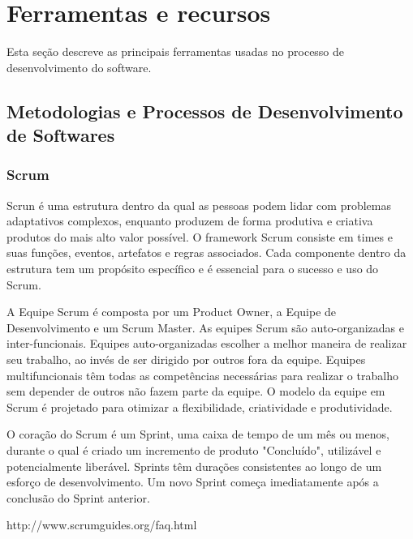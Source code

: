 \chapter{Ferramentas e recursos}

Esta seção descreve as principais ferramentas usadas no processo de desenvolvimento do software.

\section{Metodologias e Processos de Desenvolvimento de Softwares}

\subsection{Scrum}
Scrun é uma estrutura dentro da qual as pessoas podem lidar com problemas adaptativos complexos, enquanto produzem de forma produtiva e criativa produtos do mais alto valor possível. O framework Scrum consiste em times e suas funções, eventos, artefatos e regras associados. Cada componente dentro da estrutura tem um propósito específico e é essencial para o sucesso e uso do Scrum.

A Equipe Scrum é composta por um Product Owner, a Equipe de Desenvolvimento e um Scrum Master. As equipes Scrum são auto-organizadas e inter-funcionais. Equipes auto-organizadas escolher a melhor maneira de realizar seu trabalho, ao invés de ser dirigido por outros fora da equipe. Equipes multifuncionais têm todas as competências necessárias para realizar o trabalho sem depender de outros não fazem parte da equipe. O modelo da equipe em Scrum é projetado para otimizar a flexibilidade, criatividade e produtividade.

O coração do Scrum é um Sprint, uma caixa de tempo de um mês ou menos, durante o qual é criado um incremento de produto "Concluído", utilizável e potencialmente liberável. Sprints têm durações consistentes ao longo de um esforço de desenvolvimento. Um novo Sprint começa imediatamente após a conclusão do Sprint anterior.

http://www.scrumguides.org/faq.html









